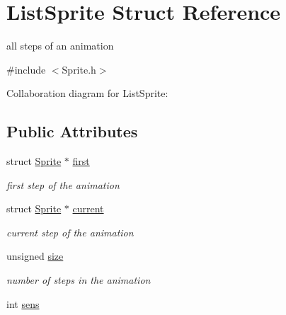 \hypertarget{structListSprite}{}\section{List\+Sprite Struct Reference}
\label{structListSprite}


all steps of an animation  




{\ttfamily \#include $<$Sprite.\+h$>$}



Collaboration diagram for List\+Sprite\+:
\subsection*{Public Attributes}
\begin{DoxyCompactItemize}
\item 
struct \hyperlink{structSprite}{Sprite} $\ast$ \hyperlink{structListSprite_ad41ce43653720df274c72fbd815e0964}{first}\hypertarget{structListSprite_ad41ce43653720df274c72fbd815e0964}{}\label{structListSprite_ad41ce43653720df274c72fbd815e0964}

\begin{DoxyCompactList}\small\item\em first step of the animation \end{DoxyCompactList}\item 
struct \hyperlink{structSprite}{Sprite} $\ast$ \hyperlink{structListSprite_af1ff65ccde99d5b0c789277c31982bea}{current}\hypertarget{structListSprite_af1ff65ccde99d5b0c789277c31982bea}{}\label{structListSprite_af1ff65ccde99d5b0c789277c31982bea}

\begin{DoxyCompactList}\small\item\em current step of the animation \end{DoxyCompactList}\item 
unsigned \hyperlink{structListSprite_a6dd83abf2a154c0a4cc8887d7ffc20e3}{size}\hypertarget{structListSprite_a6dd83abf2a154c0a4cc8887d7ffc20e3}{}\label{structListSprite_a6dd83abf2a154c0a4cc8887d7ffc20e3}

\begin{DoxyCompactList}\small\item\em number of steps in the animation \end{DoxyCompactList}\item 
int \hyperlink{structListSprite_a2f28d2c699f6cf22ff8ebfed1d71fc75}{sens}\hypertarget{structListSprite_a2f28d2c699f6cf22ff8ebfed1d71fc75}{}\label{structListSprite_a2f28d2c699f6cf22ff8ebfed1d71fc75}


\end{DoxyCompactItemize}
